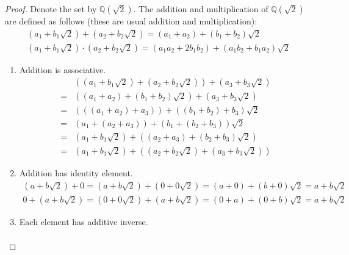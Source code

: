 \begin{proof}
    Denote the set by $\mathbb{Q}(\sqrt{2})$. The addition and multiplication of $\mathbb{Q}(\sqrt{2})$ are defined as follows (these are usual addition and multiplication):
    \[
        \begin{split}
            (a_{1} + b_{1}\sqrt{2}) + (a_{2} + b_{2}\sqrt{2}) = (a_{1} + a_{2}) + (b_{1} + b_{2})\sqrt{2} \\
            (a_{1} + b_{1}\sqrt{2}) \cdot (a_{2} + b_{2}\sqrt{2}) = (a_{1}a_{2} + 2b_{1}b_{2}) + (a_{1}b_{2} + b_{1}a_{2})\sqrt{2}
        \end{split}
    \]

    \begin{enumerate}[label = (\arabic*)]
        \item Addition is associative.
              \begin{align*}
                    & \left((a_{1} + b_{1}\sqrt{2}) + (a_{2} + b_{2}\sqrt{2})\right) + (a_{3} + b_{3}\sqrt{2})                    \\
                  = & \left((a_{1} + a_{2}) + (b_{1} + b_{2})\sqrt{2}\right) + (a_{3} + b_{3}\sqrt{2})                            \\
                  = & \left(\left((a_{1} + a_{2}) + a_{3}\right)\right) + \left(\left(b_{1} + b_{2}\right) + b_{3}\right)\sqrt{2} \\
                  = & \left(a_{1} + \left(a_{2} + a_{3}\right)\right) + \left(b_{1} + \left(b_{2} + b_{3}\right)\right)\sqrt{2}   \\
                  = & (a_{1} + b_{1}\sqrt{2}) + \left((a_{2} + a_{3}) + (b_{2} + b_{3})\sqrt{2}\right)                            \\
                  = & (a_{1} + b_{1}\sqrt{2}) + \left((a_{2} + b_{2}\sqrt{2}) + (a_{3} + b_{3}\sqrt{2})\right)
              \end{align*}
        \item Addition has identity element.
              \begin{align*}
                  (a + b\sqrt{2}) + 0 = (a + b\sqrt{2}) + (0 + 0\sqrt{2}) = (a + 0) + (b + 0)\sqrt{2} = a + b\sqrt{2} \\
                  0 + (a + b\sqrt{2}) = (0 + 0\sqrt{2}) + (a + b\sqrt{2}) = (0 + a) + (0 + b)\sqrt{2} = a + b\sqrt{2}
              \end{align*}
        \item Each element has additive inverse.
              \begin{align*}

\end{align*}
\end{enumerate}
\end{proof}
